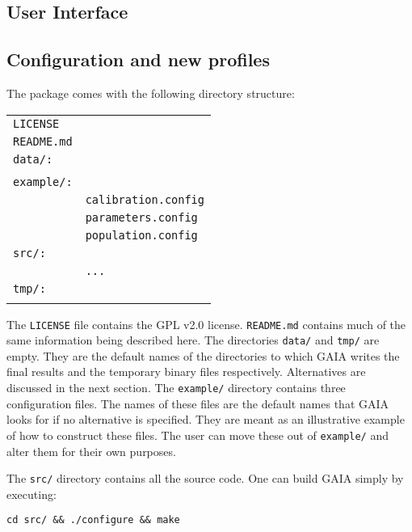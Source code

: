 \documentclass[10pt,a4paper,final]{article}
\numberwithin{equation}{section}
\newenvironment{Table}
  {\par\bigskip\noindent\minipage{\columnwidth}\centering}
    {\endminipage\par\bigskip}
\begin{document}
\begin{multicols}{2}[]
		\section{User Interface}

		\subsection{Configuration and new profiles}

			The package comes with the following directory structure:

			\begin{Table}
			\begin{tabular}{ll}
				\texttt{LICENSE} & \\
				\texttt{README.md} & \\
				\texttt{data/:} & \\
				& \\
				\texttt{example/:} & \\
				& \texttt{calibration.config} \\
				& \texttt{parameters.config} \\
				& \texttt{population.config} \\
				\texttt{src/:} & \\
				& \texttt{...}\\
				\texttt{tmp/:} & \\
				& 
			\end{tabular}
			\end{Table}

			The \texttt{LICENSE} file contains the GPL v2.0 license. \texttt{README.md} contains
			much of the same information being described here. The directories \texttt{data/}
			and \texttt{tmp/} are empty. They are the default names of the directories to which
			GAIA writes the final results and the temporary binary files respectively. Alternatives
			are discussed in the next section. The \texttt{example/} directory contains three
			configuration files. The names of these files are the default names that GAIA
			looks for if no alternative is specified. They are meant as an illustrative example
			of how to construct these files. The user can move these out of \texttt{example/}
			and alter them for their own purposes.

			The \texttt{src/} directory contains all the source code. One can build GAIA simply
			by executing:

			\begin{center}
				\texttt{cd src/ \&\& ./configure \&\& make}
			\end{center}
			

\end{multicols}
\end{document}
